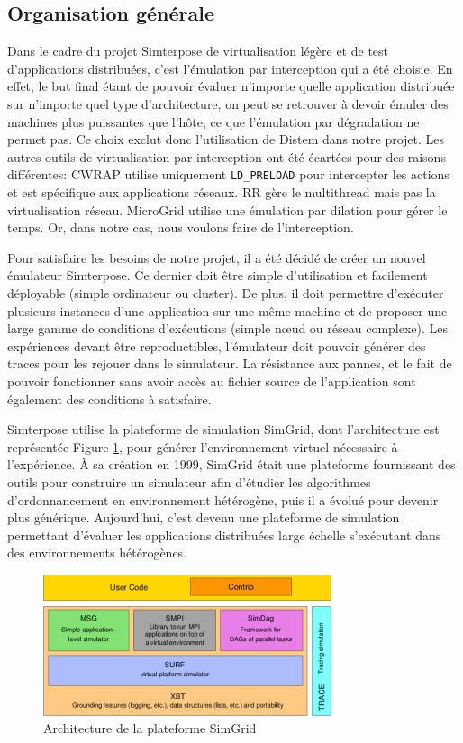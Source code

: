 \subsection{Organisation générale}

Dans le cadre du projet Simterpose de virtualisation légère et de test
d'applications distribuées, c'est l'émulation par interception qui a été
choisie. En effet, le but final étant de pouvoir évaluer n'importe quelle
application distribuée sur n'importe quel type d'architecture, on peut se
retrouver à devoir émuler des machines plus puissantes que l'hôte, ce que
l'émulation par dégradation ne permet pas. Ce choix exclut donc l'utilisation de
Distem dans notre projet. Les autres outils de virtualisation par interception
ont été écartées pour des raisons différentes: CWRAP utilise uniquement
\texttt{LD\_PRELOAD} pour intercepter les actions et est spécifique aux
applications réseaux. RR gère le multithread mais pas la virtualisation réseau. MicroGrid utilise une émulation par dilation pour gérer le temps. Or, dans notre cas, nous voulons faire de l'interception.

Pour satisfaire les besoins de notre projet, il a été décidé de créer un nouvel
émulateur Simterpose. Ce dernier doit être simple d'utilisation et facilement
déployable (simple ordinateur ou cluster).  De plus, il doit permettre
d'exécuter plusieurs instances d'une application sur une même machine et de proposer une large gamme de conditions d'exécutions (simple n\oe ud ou réseau
complexe). Les expériences devant être reproductibles, l'émulateur doit pouvoir
générer des traces pour les rejouer dans le simulateur. La résistance aux
pannes, et le fait de pouvoir fonctionner sans avoir accès au fichier source de
l'application sont également des conditions à satisfaire.

Simterpose utilise la plateforme de simulation SimGrid, dont l'architecture
est représentée Figure \ref{SimGrid}, pour générer l'environnement virtuel
nécessaire à l'expérience. À sa création en 1999, SimGrid
\citep{CASANOVA:SimGrid} était une plateforme fournissant des outils pour
construire un simulateur afin d'étudier les algorithmes d'ordonnancement en
environnement hétérogène, puis il a évolué \citep{MARTIN:SimGrid} pour devenir
plus générique. Aujourd'hui, c'est devenu une plateforme de simulation
permettant d'évaluer les applications distribuées large échelle s'exécutant dans
des environnements hétérogènes.
 
\begin{figure}[H]
  \centering
  \includegraphics{Pictures/png/SimGrid}
  \caption{Architecture de la plateforme SimGrid}
  \label{SimGrid}
\end{figure}

